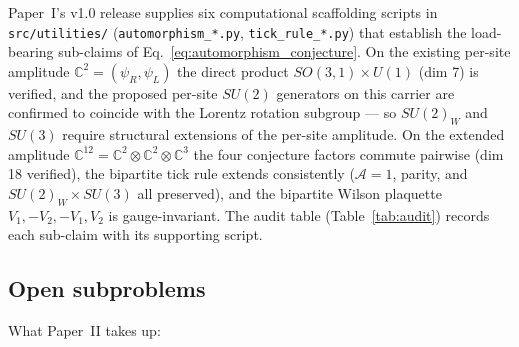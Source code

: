 Paper~I's v1.0 release supplies six computational scaffolding
scripts in \nolinkurl{src/utilities/}
(\nolinkurl{automorphism_*.py}, \nolinkurl{tick_rule_*.py}) that
establish the load-bearing
sub-claims of Eq.~\eqref{eq:automorphism_conjecture}.  On the
existing per-site amplitude $\mathbb{C}^2 = (\psi_R, \psi_L)$ the
direct product $SO(3,1) \times U(1)$ (dim 7) is verified, and the
proposed per-site $SU(2)$ generators on this carrier are confirmed
to coincide with the Lorentz rotation subgroup --- so
$SU(2)_W$ and $SU(3)$ require structural extensions of the per-site
amplitude.  On the extended amplitude
$\mathbb{C}^{12} = \mathbb{C}^2 \otimes \mathbb{C}^2 \otimes
\mathbb{C}^3$ the four conjecture factors commute pairwise (dim 18
verified), the bipartite tick rule extends consistently
($\mathcal{A}=1$, parity, and $SU(2)_W \times SU(3)$ all preserved),
and the bipartite Wilson plaquette $V_1, -V_2, -V_1, V_2$ is
gauge-invariant.  The audit table (Table~\ref{tab:audit}) records
each sub-claim with its supporting script.



\subsection{Open subproblems}
\label{subsec:open_subproblems}

What Paper~II takes up:

